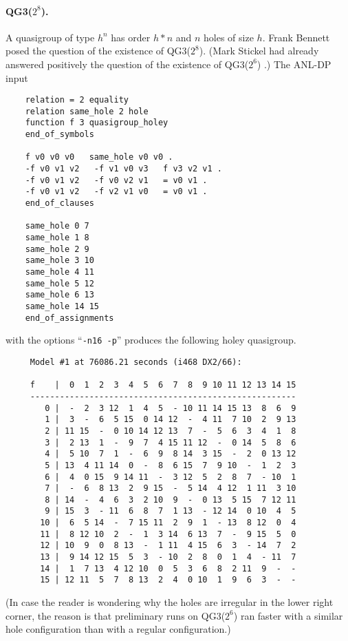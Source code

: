 \paragraph{QG3($2^8$).}  A quasigroup of type $h^n$ has order $h*n$
and $n$ holes of size $h$.  Frank Bennett posed \cite{bennett-email}
the question of the existence of QG3($2^8$).  (Mark Stickel had
already answered positively the question of the existence of QG3($2^6$)
\cite{bennett-email}.)
The ANL-DP input
{\small \begin{verbatim}
    relation = 2 equality
    relation same_hole 2 hole
    function f 3 quasigroup_holey
    end_of_symbols
    
    f v0 v0 v0   same_hole v0 v0 .
    -f v0 v1 v2   -f v1 v0 v3   f v3 v2 v1 .  
    -f v0 v1 v2   -f v0 v2 v1   = v0 v1 .
    -f v0 v1 v2   -f v2 v1 v0   = v0 v1 .
    end_of_clauses
    
    same_hole 0 7
    same_hole 1 8
    same_hole 2 9
    same_hole 3 10
    same_hole 4 11
    same_hole 5 12
    same_hole 6 13
    same_hole 14 15
    end_of_assignments
\end{verbatim}} \noindent
with the options ``\verb:-n16 -p:'' produces the following holey quasigroup.
{\small \begin{verbatim}
     Model #1 at 76086.21 seconds (i468 DX2/66):

     f    |  0  1  2  3  4  5  6  7  8  9 10 11 12 13 14 15
     ------------------------------------------------------
        0 |  -  2  3 12  1  4  5  - 10 11 14 15 13  8  6  9
        1 |  3  -  6  5 15  0 14 12  -  4 11  7 10  2  9 13
        2 | 11 15  -  0 10 14 12 13  7  -  5  6  3  4  1  8
        3 |  2 13  1  -  9  7  4 15 11 12  -  0 14  5  8  6
        4 |  5 10  7  1  -  6  9  8 14  3 15  -  2  0 13 12
        5 | 13  4 11 14  0  -  8  6 15  7  9 10  -  1  2  3
        6 |  4  0 15  9 14 11  -  3 12  5  2  8  7  - 10  1
        7 |  -  6  8 13  2  9 15  -  5 14  4 12  1 11  3 10
        8 | 14  -  4  6  3  2 10  9  -  0 13  5 15  7 12 11
        9 | 15  3  - 11  6  8  7  1 13  - 12 14  0 10  4  5
       10 |  6  5 14  -  7 15 11  2  9  1  - 13  8 12  0  4
       11 |  8 12 10  2  -  1  3 14  6 13  7  -  9 15  5  0
       12 | 10  9  0  8 13  -  1 11  4 15  6  3  - 14  7  2
       13 |  9 14 12 15  5  3  - 10  2  8  0  1  4  - 11  7
       14 |  1  7 13  4 12 10  0  5  3  6  8  2 11  9  -  -
       15 | 12 11  5  7  8 13  2  4  0 10  1  9  6  3  -  -
\end{verbatim}} \noindent
(In case the reader is wondering why the holes are irregular in the
lower right corner, the reason is that preliminary runs on QG3($2^6$)
ran faster with a similar hole configuration than with a regular
configuration.)

